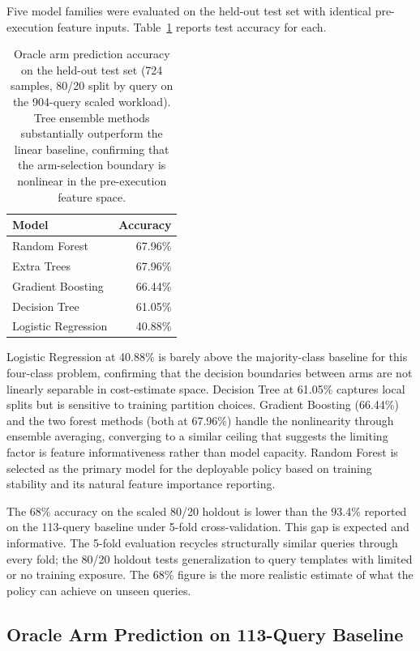 \documentclass[sigconf,natbib=false]{article}
\begin{document}
Five model families were evaluated on the held-out test set with identical pre-execution
feature inputs. Table~\ref{tab:model_compare} reports test accuracy for each.

\begin{table}[ht]
  \centering
  \caption{Oracle arm prediction accuracy on the held-out test set (724 samples, 80/20
  split by query on the 904-query scaled workload). Tree ensemble methods substantially
  outperform the linear baseline, confirming that the arm-selection boundary is nonlinear
  in the pre-execution feature space.}
  \label{tab:model_compare}
  \small
  \begin{tabular}{@{}lr@{}}
    \toprule
    \textbf{Model} & \textbf{Accuracy} \\
    \midrule
    Random Forest       & 67.96\% \\
    Extra Trees         & 67.96\% \\
    Gradient Boosting   & 66.44\% \\
    Decision Tree       & 61.05\% \\
    Logistic Regression & 40.88\% \\
    \bottomrule
  \end{tabular}
\end{table}

Logistic Regression at 40.88\% is barely above the majority-class baseline for this
four-class problem, confirming that the decision boundaries between arms are not linearly
separable in cost-estimate space. Decision Tree at 61.05\% captures local splits but is
sensitive to training partition choices. Gradient Boosting (66.44\%) and the two forest
methods (both at 67.96\%) handle the nonlinearity through ensemble averaging, converging
to a similar ceiling that suggests the limiting factor is feature informativeness rather
than model capacity. Random Forest is selected as the primary model for the deployable
policy based on training stability and its natural feature importance reporting.

The 68\% accuracy on the scaled 80/20 holdout is lower than the 93.4\% reported on the
113-query baseline under 5-fold cross-validation. This gap is expected and informative.
The 5-fold evaluation recycles structurally similar queries through every fold; the 80/20
holdout tests generalization to query templates with limited or no training exposure.
The 68\% figure is the more realistic estimate of what the policy can achieve on unseen
queries.

\subsection{Oracle Arm Prediction on 113-Query Baseline}
\label{sec:ml:baseline}
\end{document}
